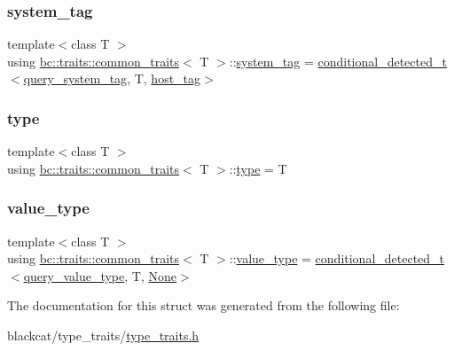 \subsubsection{\texorpdfstring{system\+\_\+tag}{system\_tag}}
{\footnotesize\ttfamily template$<$class T $>$ \\
using \hyperlink{structbc_1_1traits_1_1common__traits}{bc\+::traits\+::common\+\_\+traits}$<$ T $>$\+::\hyperlink{structbc_1_1traits_1_1common__traits_a630fda1311989a031781f6e228dc0523}{system\+\_\+tag} =  \hyperlink{namespacebc_1_1traits_a1a6d378947ec32acd457890854bcd592}{conditional\+\_\+detected\+\_\+t}$<$\hyperlink{namespacebc_1_1traits_acfa34d40f06d5122586d7adefdfeb42f}{query\+\_\+system\+\_\+tag}, T, \hyperlink{structbc_1_1host__tag}{host\+\_\+tag}$>$}

\mbox{\label{structbc_1_1traits_1_1common__traits_ae7549f5bfa9a9b046fa6441cc27c1d2b}} 
\subsubsection{\texorpdfstring{type}{type}}
{\footnotesize\ttfamily template$<$class T $>$ \\
using \hyperlink{structbc_1_1traits_1_1common__traits}{bc\+::traits\+::common\+\_\+traits}$<$ T $>$\+::\hyperlink{structbc_1_1traits_1_1common__traits_ae7549f5bfa9a9b046fa6441cc27c1d2b}{type} =  T}

\mbox{\label{structbc_1_1traits_1_1common__traits_aa9c4393dd536fe43e9b5c09fc02c534b}} 
\subsubsection{\texorpdfstring{value\+\_\+type}{value\_type}}
{\footnotesize\ttfamily template$<$class T $>$ \\
using \hyperlink{structbc_1_1traits_1_1common__traits}{bc\+::traits\+::common\+\_\+traits}$<$ T $>$\+::\hyperlink{structbc_1_1traits_1_1common__traits_aa9c4393dd536fe43e9b5c09fc02c534b}{value\+\_\+type} =  \hyperlink{namespacebc_1_1traits_a1a6d378947ec32acd457890854bcd592}{conditional\+\_\+detected\+\_\+t}$<$\hyperlink{namespacebc_1_1traits_a40b9437a2ec1bb34ee7d506c8053f906}{query\+\_\+value\+\_\+type}, T, \hyperlink{classbc_1_1traits_1_1None}{None}$>$}



The documentation for this struct was generated from the following file\+:\begin{DoxyCompactItemize}
\item 
blackcat/type\+\_\+traits/\hyperlink{type__traits_2type__traits_8h}{type\+\_\+traits.\+h}\end{DoxyCompactItemize}
